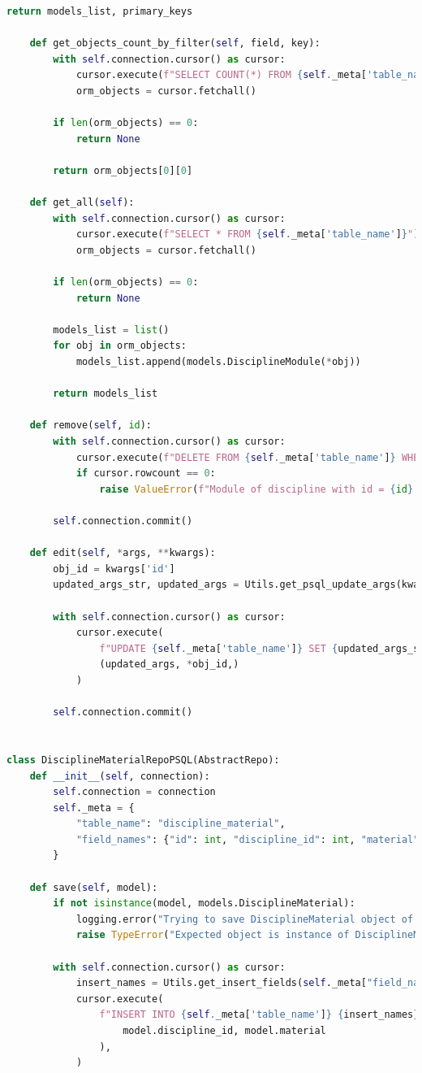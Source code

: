 \begin{lstlisting}[label=lst:db-postgresql, caption=Листинг модуля взаимодействия c СУБД PostgreSQL, language=python]
		return models_list, primary_keys
	
	def get_objects_count_by_filter(self, field, key):
		with self.connection.cursor() as cursor:
			cursor.execute(f"SELECT COUNT(*) FROM {self._meta['table_name']} WHERE {field} = %s", (key,))
			orm_objects = cursor.fetchall()
		
		if len(orm_objects) == 0:
			return None
		
		return orm_objects[0][0]
	
	def get_all(self):
		with self.connection.cursor() as cursor:
			cursor.execute(f"SELECT * FROM {self._meta['table_name']}")
			orm_objects = cursor.fetchall()
		
		if len(orm_objects) == 0:
			return None
		
		models_list = list()
		for obj in orm_objects:
			models_list.append(models.DisciplineModule(*obj))
		
		return models_list
	
	def remove(self, id):
		with self.connection.cursor() as cursor:
			cursor.execute(f"DELETE FROM {self._meta['table_name']} WHERE id = %s", (id,))
			if cursor.rowcount == 0:
				raise ValueError(f"Module of discipline with id = {id} doesn't exists.")
		
		self.connection.commit()
	
	def edit(self, *args, **kwargs):
		obj_id = kwargs['id']
		updated_args_str, updated_args = Utils.get_psql_update_args(kwargs['fields'])
		
		with self.connection.cursor() as cursor:
			cursor.execute(
				f"UPDATE {self._meta['table_name']} SET {updated_args_str} WHERE id = %s",
				(updated_args, *obj_id,)
			)
		
		self.connection.commit()


class DisciplineMaterialRepoPSQL(AbstractRepo):
	def __init__(self, connection):
		self.connection = connection
		self._meta = {
			"table_name": "discipline_material",
			"field_names": {"id": int, "discipline_id": int, "material": str}
		}
	
	def save(self, model):
		if not isinstance(model, models.DisciplineMaterial):
			logging.error("Trying to save DisciplineMaterial object of invalid type")
			raise TypeError("Expected object is instance of DisciplineMaterial")
		
		with self.connection.cursor() as cursor:
			insert_names = Utils.get_insert_fields(self._meta["field_names"])
			cursor.execute(
				f"INSERT INTO {self._meta['table_name']} {insert_names} VALUES (%s, %s) RETURNING id", (
					model.discipline_id, model.material
				),
			)
		

\end{lstlisting}
